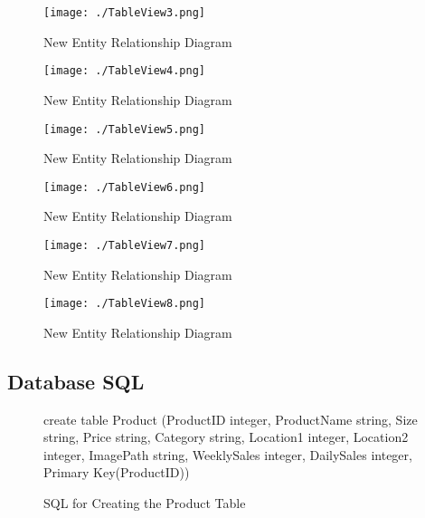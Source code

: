 \begin{figure}[H]
    \texttt{[image: ./TableView3.png]}
    \caption{New Entity Relationship Diagram} \label{fig:table-view-3}
\end{figure}

\begin{figure}[H]
    \texttt{[image: ./TableView4.png]}
    \caption{New Entity Relationship Diagram} \label{fig:table-view-4}
\end{figure}

\begin{figure}[H]
    \texttt{[image: ./TableView5.png]}
    \caption{New Entity Relationship Diagram} \label{fig:table-view-5}
\end{figure}

\begin{figure}[H]
    \texttt{[image: ./TableView6.png]}
    \caption{New Entity Relationship Diagram} \label{fig:table-view-6}
\end{figure}

\begin{figure}[H]
    \texttt{[image: ./TableView7.png]}
    \caption{New Entity Relationship Diagram} \label{fig:table-view-7}
\end{figure}

\begin{figure}[H]
    \texttt{[image: ./TableView8.png]}
    \caption{New Entity Relationship Diagram} \label{fig:table-view-8}
\end{figure}

\pagebreak
\subsection{Database SQL}

\begin{figure}[H]
	 \caption{SQL for Creating the Product Table} \label{fig:product-sql}
	\begin{sql}
	create table Product
              (ProductID integer,
              ProductName string,
              Size string,
              Price string,
              Category string,
              Location1 integer,
              Location2 integer,
              ImagePath string,
              WeeklySales integer,
              DailySales integer,
              Primary Key(ProductID))
	\end{sql}
\end{figure}

